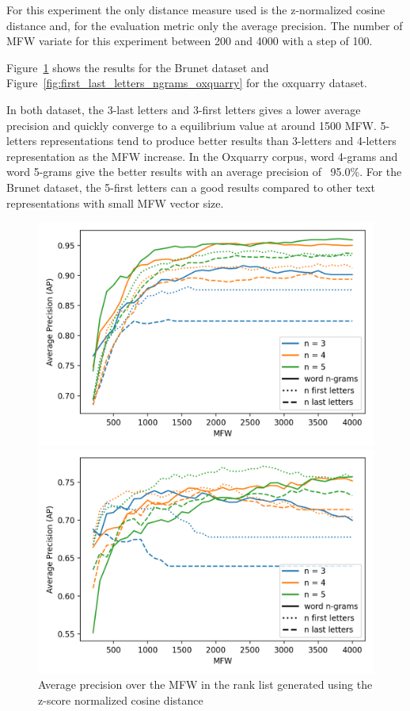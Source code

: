 For this experiment the only distance measure used is the z-normalized cosine distance and, for the evaluation metric only the average precision.
The number of MFW variate for this experiment between 200 and 4000 with a step of 100.

Figure~\ref{fig:first_last_letters_ngrams_brunet} shows the results for the Brunet dataset and Figure~\ref{fig:first_last_letters_ngrams_oxquarry} for the oxquarry dataset.

In both dataset, the 3-last letters and 3-first letters gives a lower average precision and quickly converge to a equilibrium value at around 1500 MFW.
5-letters representations tend to produce better results than 3-letters and 4-letters representation as the MFW increase.
In the Oxquarry corpus, word 4-grams and word 5-grams give the better results with an average precision of ~95.0\%.
For the Brunet dataset, the 5-first letters can a good results compared to other text representations with small MFW vector size.

\begin{figure}
  \centering
  \caption{Average precision over the MFW in the rank list generated using the z-score normalized cosine distance}

  \label{fig:first_last_letters_ngrams_oxquarry}
  \includegraphics[width=\linewidth]{img/first_last_letters_ngrams_oxquarry.png}

  \label{fig:first_last_letters_ngrams_brunet}
  \includegraphics[width=\linewidth]{img/first_last_letters_ngrams_brunet.png}
\end{figure}

